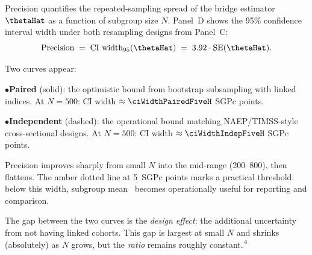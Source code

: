 \documentclass[10pt]{article}
\begin{document}
\noindent
\begin{minipage}[t]{3.75in}
  \vspace{0.05in}
  \hspace{0.15in}%
  \begin{minipage}{3.45in}
    \small\raggedright\color{bodyGrey}

    Precision quantifies the repeated-sampling spread of the bridge estimator
    $\thetaHat$ as a function of subgroup size $N$. Panel~D shows the 95\%
    confidence interval width under both resampling designs from Panel~C:
    \[
      \text{Precision} \;=\; \text{CI width}_{95}(\thetaHat)
      \;=\; 3.92 \cdot \mathrm{SE}(\thetaHat).
    \]

    \vspace{4pt}
    Two curves appear:

    \vspace{2pt}
    \hspace{5pt}$\bullet$\;\textcolor{pairedTeal}{\bfseries Paired} (solid):
    the optimistic bound from bootstrap subsampling with linked indices.
    At $N = 500$: CI width $\approx \ciWidthPairedFiveH$ SGPc points.

    \vspace{1pt}
    \hspace{5pt}$\bullet$\;\textcolor{indepRed}{\bfseries Independent} (dashed):
    the operational bound matching NAEP/TIMSS-style cross-sectional designs.
    At $N = 500$: CI width $\approx \ciWidthIndepFiveH$ SGPc points.

    \vspace{4pt}
    Precision improves sharply from small $N$ into the mid-range (200--800),
    then flattens. The amber dotted line at 5~SGPc points marks a
    practical threshold: below this width, subgroup mean \SGPc\ becomes
    operationally useful for reporting and comparison.

    \vspace{4pt}
    The gap between the two curves is the \emph{design effect}: the
    additional uncertainty from not having linked cohorts. This gap is
    largest at small $N$ and shrinks (absolutely) as $N$ grows, but the
    \emph{ratio} remains roughly constant.$^{\mbox{\footnotesize{4}}}$

  \end{minipage}
  \vspace{0.1in}
\end{minipage}
\end{document}
